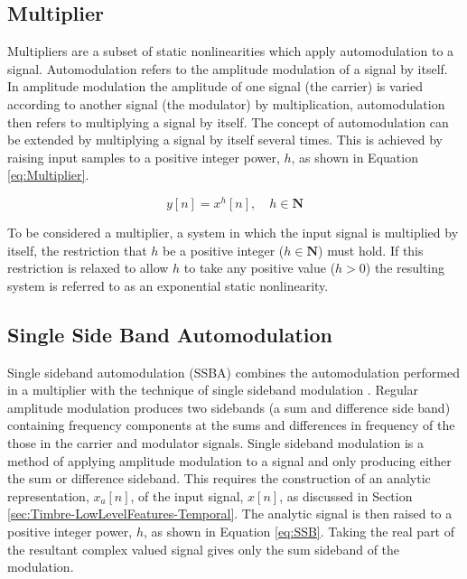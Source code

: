 	\subsection{Multiplier}
	\label{sec:Excitation-Methods-Multiplier}
		Multipliers are a subset of static nonlinearities which apply automodulation to a signal. Automodulation
		refers to the amplitude modulation of a signal by itself. In amplitude modulation the amplitude of one
		signal (the carrier) is varied according to another signal (the modulator) by multiplication,
		automodulation then refers to multiplying a signal by itself. The concept of automodulation can be extended
		by multiplying a signal by itself several times. This is achieved by raising input samples to a positive
		integer power, $h$, as shown in Equation \ref{eq:Multiplier}.

		\begin{equation}
			y[n] = x^{h}[n], \quad h \in \textbf{N}
			\label{eq:Multiplier}
		\end{equation}

		To be considered a multiplier, a system in which the input signal is multiplied by itself, the restriction
		that $h$ be a positive integer ($h \in \textbf{N}$) must hold. If this restriction is relaxed to allow $h$
		to take any positive value ($h > 0$) the resulting system is referred to as an exponential static
		nonlinearity.

	\subsection{Single Side Band Automodulation}
	\label{sec:Excitation-Methods-SSBA}
		Single sideband automodulation (SSBA) combines the automodulation performed in a multiplier with the
		technique of single sideband modulation \citep{corinthios2009signals}. Regular amplitude modulation
		produces two sidebands (a sum and difference side band) containing frequency components at the sums and
		differences in frequency of the those in the carrier and modulator signals. Single sideband modulation is a
		method of applying amplitude modulation to a signal and only producing either the sum or difference
		sideband. This requires the construction of an analytic representation, $x_{a}[n]$, of the input signal,
		$x[n]$, as discussed in Section \ref{sec:Timbre-LowLevelFeatures-Temporal}. The analytic signal is then
		raised to a positive integer power, $h$, as shown in Equation \ref{eq:SSB}. Taking the real part of the
		resultant complex valued signal gives only the sum sideband of the modulation.

